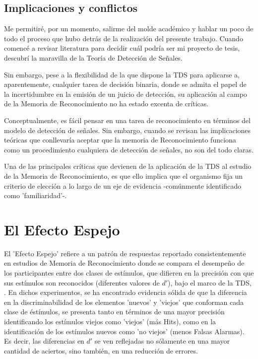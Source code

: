 \subsection{Implicaciones y conflictos}



Me permitiré, por un momento, salirme del molde académico y hablar un poco de todo el proceso que hubo detrás de la realización del presente trabajo. Cuando comencé a revisar literatura para decidir cuál podría ser mi proyecto de tesis, descubrí la maravilla de la Teoría de Detección de Señales. 

Sin embargo, pese a la flexibilidad de la que dispone la TDS para aplicarse a, aparentemente, cualquier tarea de decisión binaria, donde se admita el papel de la incertidumbre en la emisión de un juicio de detección, su aplicación al campo de la Memoria de Reconocimiento no ha estado excenta de críticas.

Conceptualmente, es fácil pensar en una tarea de reconocimiento en términos del modelo de detección de señales. Sin embargo, cuando se revisan las implicaciones teóricas que conllevaría aceptar que la memoria de Reconocimiento funciona como un procedimiento cualquiera de detección de señales, no son del todo claras. 

Una de las principales críticas que devienen de la aplicación de la TDS al estudio de la Memoria de Reconocimiento, es que ello implica que el organismo fija un criterio de elección a lo largo de un eje de evidencia -comúnmente identificado como 'familiaridad'-.   \parencite{Brown1977}

\section{El Efecto Espejo}

El 'Efecto Espejo' refiere a un patrón de respuestas reportado consistentemente en estudios de Memoria de Reconocimiento donde se compara el desempeño de los participantes entre dos clases de estímulos, que difieren en la precisión con que sus estímulos son reconocidos (diferentes valores de $d'$), bajo el marco de la TDS, \parencite{Glanzer1993}. En dichos experimentos, se ha encontrado evidencia sólida de que la diferencia en la discriminabilidad de los elementos 'nuevos' y 'viejos' que conforman cada clase de éstímulos, se presenta tanto en términos de una mayor precisión identificando los estímulos viejos como 'viejos' (más Hits), como en la identificación de los estímulos nuevos como 'no viejos' (menos Falsas Alarmas). Es decir, las diferencias en $d'$ se ven reflejadas no sólamente en una mayor cantidad de aciertos, sino también, en una reducción de errores.\\

